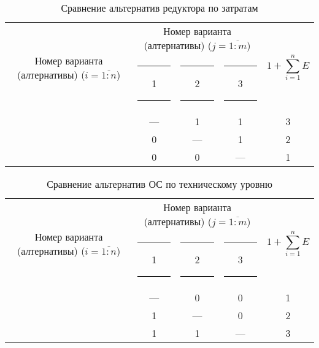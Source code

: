 \begin{table}[H]
    \centering
    \begin{tabular}{|c|c|c|c|c|}
        \hline
        \multirow{2}{2.4cm}[-0.5pc]{
            \centering
            Номер варианта (алтернативы) ($i = \overline{1:n}$)
        } &
        \multicolumn{3}{c|}{
            \parbox[t]{2.4cm}{
                \centering
                Номер варианта (алтернативы) ($j = \overline{1:m}$)
            }
        } &
        \multirow{2}{1.7cm}{
            \centering
            $$1 + \sum_{i=1}^n E$$
        } \\
        &
        \centering \rule{2pt}{0pt} 1 \rule{2pt}{0pt} &
        \centering \rule{2pt}{0pt} 2 \rule{2pt}{0pt} &
        \centering \rule{2pt}{0pt} 3 \rule{2pt}{0pt} & \\
        \hline \hline
        \centering{1} &---& 1 & 1 & 3 \\ \hline
        \centering{2} & 0 &---& 1 & 2 \\ \hline
        \centering{3} & 0 & 0 &---& 1 \\ \hline
    \end{tabular}
    \caption{Сравнение альтернатив редуктора по затратам}
    \label{tbl_red_cost_lvl_comparison}
\end{table}

\begin{table}[H]
    \centering
    \begin{tabular}{|c|c|c|c|c|}
        \hline
        \multirow{2}{2.4cm}[-0.5pc]{
            \centering
            Номер варианта (алтернативы) ($i = \overline{1:n}$)
        } &
        \multicolumn{3}{c|}{
            \parbox[t]{2.4cm}{
                \centering
                Номер варианта (алтернативы) ($j = \overline{1:m}$)
            }
        } &
        \multirow{2}{1.7cm}{
            \centering
            $$1 + \sum_{i=1}^n E$$
        } \\
        &
        \centering \rule{2pt}{0pt} 1 \rule{2pt}{0pt} &
        \centering \rule{2pt}{0pt} 2 \rule{2pt}{0pt} &
        \centering \rule{2pt}{0pt} 3 \rule{2pt}{0pt} & \\
        \hline \hline
        \centering{1} &---& 0 & 0 & 1 \\ \hline
        \centering{2} & 1 &---& 0 & 2 \\ \hline
        \centering{3} & 1 & 1 &---& 3 \\ \hline
    \end{tabular}
    \caption{Сравнение альтернатив ОС по техническому уровню}
    \label{tbl_os_tech_lvl_comparison}
\end{table}

